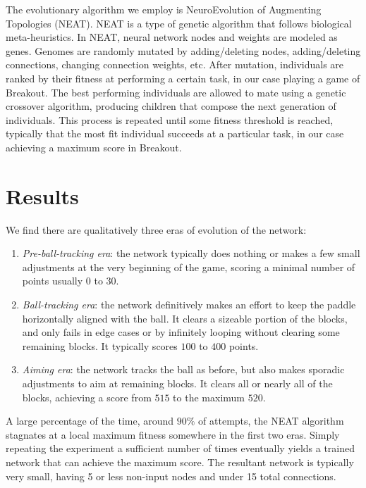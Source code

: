 \documentclass[letterpaper, twocolumn]{article}
\begin{document}
The evolutionary algorithm we employ is NeuroEvolution of Augmenting Topologies (NEAT).
NEAT is a type of genetic algorithm that follows biological meta-heuristics.
In NEAT, neural network nodes and weights are modeled as genes.
Genomes are randomly mutated by adding/deleting nodes, adding/deleting connections, changing connection weights, etc.
After mutation, individuals are ranked by their fitness at performing a certain task, in our case playing a game of Breakout.
The best performing individuals are allowed to mate using a genetic crossover algorithm,
producing children that compose the next generation of individuals.
This process is repeated until some fitness threshold is reached, typically that the most fit individual succeeds at a particular task, in our case achieving a maximum score in Breakout.

\section{Results}
We find there are qualitatively three eras of evolution of the network:
\begin{enumerate}
    \item{}\emph{Pre-ball-tracking era}: the network typically does nothing or makes a few small adjustments at the very beginning of the game, scoring a minimal number of points usually $0$ to $30$.
    \item{}\emph{Ball-tracking era}: the network definitively makes an effort to keep the paddle horizontally aligned with the ball. It clears a sizeable portion of the blocks, and only fails in edge cases or by infinitely looping without clearing some remaining blocks. It typically scores $100$ to $400$ points.
    \item{}\emph{Aiming era}: the network tracks the ball as before, but also makes sporadic adjustments to aim at remaining blocks. It clears all or nearly all of the blocks, achieving a score from $515$ to the maximum $520$.
\end{enumerate}
A large percentage of the time, around $90\%$ of attempts, the NEAT algorithm stagnates at a local maximum
fitness somewhere in the first two eras.
Simply repeating the experiment a sufficient number of times eventually yields a trained network that
can achieve the maximum score.
The resultant network is typically very small, having 5 or less non-input nodes and under 15 total connections.
\end{document}
